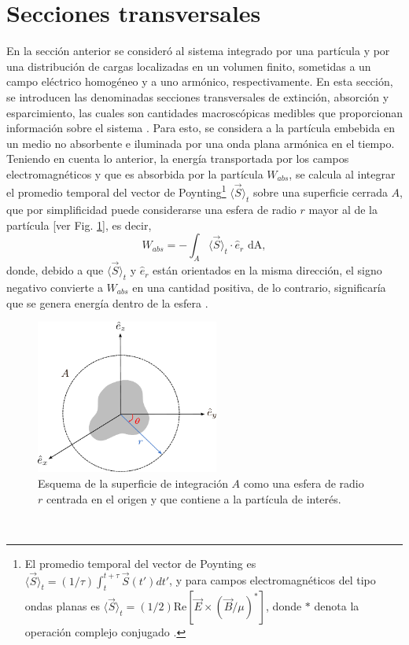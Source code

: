 

\section{Secciones transversales}
\label{section:yth}

En la sección anterior se consideró al sistema integrado por una partícula y por una distribución de cargas localizadas en un volumen finito, sometidas a un campo eléctrico homogéneo y a uno armónico, respectivamente. En esta sección, se introducen las denominadas secciones transversales de extinción, absorción y esparcimiento, las cuales son cantidades macroscópicas medibles que proporcionan información sobre el sistema \cite{bohrenAbsorptionScatteringLight2008}. Para esto, se considera a la partícula embebida en un medio no absorbente e iluminada por una onda plana armónica en el tiempo. Teniendo en cuenta lo anterior, la energía transportada por los campos electromagnéticos y que es absorbida por la partícula $W_{abs}$, se calcula al integrar el promedio temporal del vector de Poynting\footnote{El promedio temporal del vector de Poynting es $\langle\Vec{S}\rangle_t = (1/\tau)\int_t^{t+\tau}\Vec{S}(t')dt'$, y para campos electromagnéticos del tipo ondas planas es $\langle\Vec{S}\rangle_t = (1/2) \text{Re}[\Vec{E} \times (\Vec{B}/\mu)^{*}]$, donde $*$ denota la operación complejo conjugado \cite{bohrenAbsorptionScatteringLight2008}. } $\langle\Vec{S}\rangle_t$  sobre una superficie cerrada $A$, que por simplificidad puede considerarse una esfera de radio $r$ mayor al de la partícula [ver Fig. \ref{WA}], es decir, 
\begin{equation*}
	W_{abs}=-\int_A \langle\Vec{S}\rangle_t\cdot\hat{e}_r \text{ dA},
	\label{flujopoynting}
\end{equation*}
donde, debido a que $\langle\Vec{S}\rangle_t$ y $\hat{e}_r$ están orientados en la misma dirección, el signo negativo convierte a $W_{abs}$ en una cantidad positiva, de lo contrario, significaría que se genera energía dentro de la esfera \cite{bohrenAbsorptionScatteringLight2008}.
%
\begin{figure}[h]
	\centering
	\includegraphics[width=6cm]{../../Figuras/WA.pdf}
	\caption{Esquema de la superficie de integración $A$ como una esfera de radio $r$ centrada en el origen y que contiene a la partícula de interés.}
	\label{WA}
\end{figure}
\\

